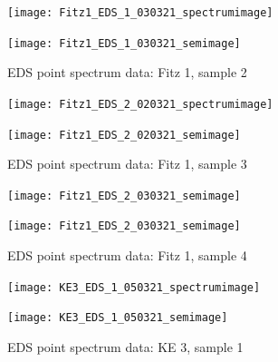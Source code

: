 \begin{figure}[H]
\centering
\begin{minipage}{.45\textwidth}
  \centering
  \texttt{[image: Fitz1\_EDS\_1\_030321\_spectrumimage]}
\end{minipage}
\begin{minipage}{.45\textwidth}
  \centering
  \texttt{[image: Fitz1\_EDS\_1\_030321\_semimage]}
\end{minipage}
\caption[EDS point spectrum data: Fitz 1, sample 2]{EDS point spectrum data: Fitz 1, sample 2}
\label{fig:fitz1_point_eds_2}
\end{figure}

\begin{figure}[H]
\centering
\begin{minipage}{.45\textwidth}
  \centering
  \texttt{[image: Fitz1\_EDS\_2\_020321\_spectrumimage]}
\end{minipage}
\begin{minipage}{.45\textwidth}
  \centering
  \texttt{[image: Fitz1\_EDS\_2\_020321\_semimage]}
\end{minipage}
\caption[EDS point spectrum data: Fitz 1, sample 3]{EDS point spectrum data: Fitz 1, sample 3}
\label{fig:fitz1_point_eds_3}
\end{figure}

\begin{figure}[H]
\centering
\begin{minipage}{.45\textwidth}
  \centering
  \texttt{[image: Fitz1\_EDS\_2\_030321\_semimage]}
\end{minipage}
\begin{minipage}{.45\textwidth}
  \centering
  \texttt{[image: Fitz1\_EDS\_2\_030321\_semimage]}
\end{minipage}
\caption[EDS point spectrum data: Fitz 1, sample 4]{EDS point spectrum data: Fitz 1, sample 4}
\label{fig:fitz1_point_eds_4}
\end{figure}



\begin{figure}[H]
\centering
\begin{minipage}{.45\textwidth}
  \centering
  \texttt{[image: KE3\_EDS\_1\_050321\_spectrumimage]}
\end{minipage}
\begin{minipage}{.45\textwidth}
  \centering
  \texttt{[image: KE3\_EDS\_1\_050321\_semimage]}
\end{minipage}
\caption[EDS point spectrum data: KE 3, sample 1]{EDS point spectrum data: KE 3, sample 1}
\label{fig:ke3_point_eds_1}
\end{figure}

